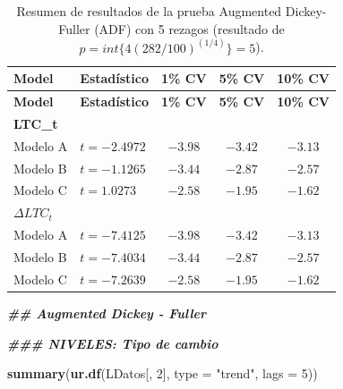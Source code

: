 \documentclass[
]{book}
\newenvironment{Shaded}{\begin{snugshade}}{\end{snugshade}}
\newcommand{\AttributeTok}[1]{\textcolor[rgb]{0.13,0.29,0.53}{#1}}
\newcommand{\DecValTok}[1]{\textcolor[rgb]{0.00,0.00,0.81}{#1}}
\newcommand{\DocumentationTok}[1]{\textcolor[rgb]{0.56,0.35,0.01}{\textbf{\textit{#1}}}}
\newcommand{\FunctionTok}[1]{\textcolor[rgb]{0.13,0.29,0.53}{\textbf{#1}}}
\newcommand{\NormalTok}[1]{#1}
\newcommand{\StringTok}[1]{\textcolor[rgb]{0.31,0.60,0.02}{#1}}
\begin{document}
\begin{longtable}[]{@{}llccc@{}}
\caption{\label{tab:DF-summary} Resumen de resultados de la prueba Augmented Dickey-Fuller (ADF) con 5 rezagos (resultado de \(p = int \{ 4 (282/100)^{(1/4)} \} = 5\)).}\tabularnewline
\toprule\noalign{}
\textbf{Model} & \textbf{Estadístico} & \textbf{1\% CV} & \textbf{5\% CV} & \textbf{10\% CV} \\
\midrule\noalign{}
\endfirsthead
\toprule\noalign{}
\textbf{Model} & \textbf{Estadístico} & \textbf{1\% CV} & \textbf{5\% CV} & \textbf{10\% CV} \\
\midrule\noalign{}
\endhead
\bottomrule\noalign{}
\endlastfoot
\textbf{LTC\_t} & & & & \\
Modelo A & \(t=-2.4972\) & \(-3.98\) & \(-3.42\) & \(-3.13\) \\
Modelo B & \(t=-1.1265\) & \(-3.44\) & \(-2.87\) & \(-2.57\) \\
Modelo C & \(t=1.0273\) & \(-2.58\) & \(-1.95\) & \(-1.62\) \\
\textbf{\(\Delta LTC_t\)} & & & & \\
Modelo A & \(t=-7.4125\) & \(-3.98\) & \(-3.42\) & \(-3.13\) \\
Modelo B & \(t=-7.4034\) & \(-3.44\) & \(-2.87\) & \(-2.57\) \\
Modelo C & \(t=-7.2639\) & \(-2.58\) & \(-1.95\) & \(-1.62\) \\
\end{longtable}

\begin{Shaded}
\begin{Highlighting}[]
\DocumentationTok{\#\# Augmented Dickey {-} Fuller}

\DocumentationTok{\#\#\# NIVELES: Tipo de cambio}

\FunctionTok{summary}\NormalTok{(}\FunctionTok{ur.df}\NormalTok{(LDatos[, }\DecValTok{2}\NormalTok{], }\AttributeTok{type =} \StringTok{"trend"}\NormalTok{, }\AttributeTok{lags =} \DecValTok{5}\NormalTok{))}
\end{Highlighting}
\end{Shaded}
\end{document}
